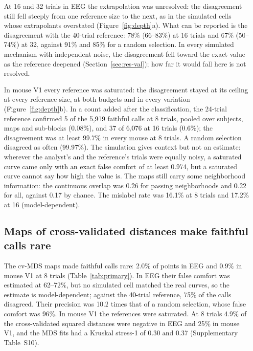 \documentclass[11pt]{article}
\newcommand{\EegRsaFCeight}{62--72}
\newcommand{\EegRsaNFeight}{2.0}
\newcommand{\MouseRsaNFeight}{0.9}
\newcommand{\MouseQeight}{16.1}
\newcommand{\MouseQsixteen}{17.2}
\newcommand{\EegDSixteen}{78}
\newcommand{\EegDSixteenLo}{66}
\newcommand{\EegDSixteenHi}{83}
\newcommand{\EegDThirtyTwo}{67}
\newcommand{\EegDThirtyTwoLo}{50}
\newcommand{\EegDThirtyTwoHi}{74}
\newcommand{\EegRsaD}{75}
\newcommand{\MouseConfirmedEight}{5}
\newcommand{\MouseCallsEight}{5{,}919}
\newcommand{\MouseConfirmedShareEight}{0.08}
\newcommand{\MouseConfirmedSixteen}{37}
\newcommand{\MouseCallsSixteen}{6{,}076}
\newcommand{\MouseConfirmedShareSixteen}{0.6}
\newcommand{\MouseDminSubject}{99.7}
\newcommand{\EegRandDeepSixteen}{91}
\newcommand{\EegRandDeepThirtyTwo}{85}
\newcommand{\EegRsaEnrich}{10.2}
\newcommand{\EegRsaRand}{96}
\newcommand{\MouseRandDeep}{99.97}
\newcommand{\BmOverlapAllMouse}{0.22}
\newcommand{\BmOverlapAccMouse}{0.26}
\newcommand{\BmChanceMouse}{0.17}
\newcommand{\CvNegEeg}{4.9}
\newcommand{\CvNegMouse}{25}
\newcommand{\CvStressEeg}{0.30}
\newcommand{\CvStressMouse}{0.37}
\newcommand{\ValSatExactMin}{0.974}
\begin{document}
At 16 and 32 trials in EEG the extrapolation was unresolved: the disagreement still fell steeply from one reference size to the next, as in the simulated cells whose extrapolants overstated (Figure~\ref{fig:depth}a).
What can be reported is the disagreement with the 40-trial reference: \EegDSixteen\% (\EegDSixteenLo--\EegDSixteenHi\%) at 16 trials and \EegDThirtyTwo\% (\EegDThirtyTwoLo--\EegDThirtyTwoHi\%) at 32, against \EegRandDeepSixteen\% and \EegRandDeepThirtyTwo\% for a random selection.
In every simulated mechanism with independent noise, the disagreement fell toward the exact value as the reference deepened (Section~\ref{sec:res-val}); how far it would fall here is not resolved.

In mouse V1 every reference was saturated: the disagreement stayed at its ceiling at every reference size, at both budgets and in every variation (Figure~\ref{fig:depth}b).
In a count added after the classification, the 24-trial reference confirmed \MouseConfirmedEight{} of the \MouseCallsEight{} faithful calls at 8 trials, pooled over subjects, maps and sub-blocks (\MouseConfirmedShareEight\%), and \MouseConfirmedSixteen{} of \MouseCallsSixteen{} at 16 trials (\MouseConfirmedShareSixteen\%); the disagreement was at least \MouseDminSubject\% in every mouse at 8 trials.
A random selection disagreed as often (\MouseRandDeep\%).
The simulation gives context but not an estimate: wherever the analyst's and the reference's trials were equally noisy, a saturated curve came only with an exact false comfort of at least \ValSatExactMin, but a saturated curve cannot say how high the value is.
The maps still carry some neighborhood information: the continuous overlap was \BmOverlapAccMouse{} for passing neighborhoods and \BmOverlapAllMouse{} for all, against \BmChanceMouse{} by chance.
The mislabel rate was \MouseQeight\% at 8 trials and \MouseQsixteen\% at 16 (model-dependent).

\subsection{Maps of cross-validated distances make faithful calls rare}\label{sec:res-rsa}

The cv-MDS maps made faithful calls rare: \EegRsaNFeight\% of points in EEG and \MouseRsaNFeight\% in mouse V1 at 8 trials (Table~\ref{tab:primary}).
In EEG their false comfort was estimated at \EegRsaFCeight\%, but no simulated cell matched the real curves, so the estimate is model-dependent; against the 40-trial reference, \EegRsaD\% of the calls disagreed.
Their precision was \EegRsaEnrich{} times that of a random selection, whose false comfort was \EegRsaRand\%.
In mouse V1 the references were saturated.
At 8 trials \CvNegEeg\% of the cross-validated squared distances were negative in EEG and \CvNegMouse\% in mouse V1, and the MDS fits had a Kruskal stress-1 of \CvStressEeg{} and \CvStressMouse{} (Supplementary Table~S10).
\end{document}
